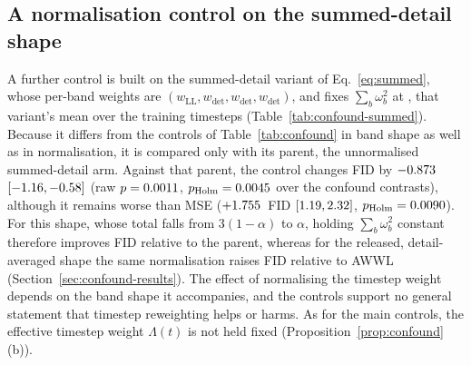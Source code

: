 
\subsection{A normalisation control on the summed-detail shape}
\label{app:supp-confound}

A further control is built on the summed-detail variant of
Eq.~\eqref{eq:summed}, whose per-band weights are
$(w_{\mathrm{LL}}, w_{\det}, w_{\det}, w_{\det})$, and fixes
$\sum_b \omega_b^2$ at \levelSqFixedSum, that variant's mean over the training
timesteps (Table~\ref{tab:confound-summed}). Because it differs from the
controls of Table~\ref{tab:confound} in band shape as well as in
normalisation, it is compared only with its parent, the unnormalised
summed-detail arm. Against that parent, the control changes FID by
$-0.873$ $[-1.16, -0.58]$
(raw $p = 0.0011$, $p_{\mathrm{Holm}} = 0.0045$
over the \nFamilyConfound{} confound contrasts), although it remains
worse than MSE ($+1.755$~FID $[1.19, 2.32]$,
$p_{\mathrm{Holm}} = 0.0090$). For this shape, whose total falls
from $3(1 - \alpha)$ to $\alpha$, holding $\sum_b \omega_b^2$ constant
therefore improves FID relative to the parent, whereas for the released,
detail-averaged shape the same normalisation raises FID relative to AWWL
(Section~\ref{sec:confound-results}). The effect of normalising the timestep
weight depends on the band shape it accompanies, and the controls support no
general statement that timestep reweighting helps or harms. As for the main
controls, the effective timestep weight $\Lambda(t)$ is not held fixed
(Proposition~\ref{prop:confound}(b)).



